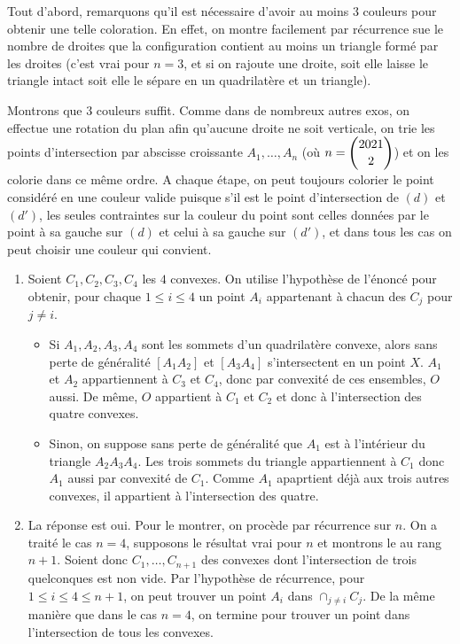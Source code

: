 \begin{sol}
Tout d'abord, remarquons qu'il est nécessaire d'avoir au moins $3$ couleurs pour obtenir une telle coloration. En effet, on montre facilement par récurrence sue le nombre de droites que la configuration contient au moins un triangle formé par les droites (c'est vrai pour $n=3$, et si on rajoute une droite, soit elle laisse le triangle intact soit elle le sépare en un quadrilatère et un triangle).

Montrons que $3$ couleurs suffit. Comme dans de nombreux autres exos, on effectue une rotation du plan afin qu'aucune droite ne soit verticale, on trie les points d'intersection par abscisse croissante $A_1,\ldots,A_n$ (où $n=\dbinom{2021}2$) et on les colorie dans ce même ordre. A chaque étape, on peut toujours colorier le point considéré en une couleur valide puisque s'il est le point d'intersection de $(d)$ et $(d')$, les seules contraintes sur la couleur du point sont celles données par le point à sa gauche sur $(d)$ et celui à sa gauche sur $(d')$, et dans tous les cas on peut choisir une couleur qui convient.
\end{sol}

\begin{sol}
\begin{enumerate}
    \item Soient $C_1,C_2,C_3,C_4$ les $4$ convexes. On utilise l'hypothèse de l'énoncé pour obtenir, pour chaque $1\le i \le 4$ un point $A_i$ appartenant à chacun des $C_j$ pour $j\ne i$. 
    \begin{itemize}
        \item Si $A_1,A_2,A_3,A_4$ sont les sommets d'un quadrilatère convexe, alors sans perte de généralité $[A_1A_2]$ et $[A_3A_4]$ s'intersectent en un point $X$. $A_1$ et $A_2$ appartiennent à $C_3$ et $C_4$, donc par convexité de ces ensembles, $O$ aussi. De même, $O$ appartient à $C_1$ et $C_2$ et donc à l'intersection des quatre convexes.
        \item Sinon, on suppose sans perte de généralité que $A_1$ est à l'intérieur du triangle $A_2A_3A_4$. Les trois sommets du triangle appartiennent à $C_1$ donc $A_1$ aussi par convexité de $C_1$. Comme $A_1$ apaprtient déjà aux trois autres convexes, il appartient à l'intersection des quatre.
    \end{itemize}
    
    \item La réponse est oui. Pour le montrer, on procède par récurrence sur $n$. On a traité le cas $n=4$, supposons le résultat vrai pour $n$ et montrons le au rang $n+1$. Soient donc $C_1,\ldots,C_{n+1}$ des convexes dont l'intersection de trois quelconques est non vide. Par l'hypothèse de récurrence, pour $1\le i\le 4\le n+1$, on peut trouver un point $A_i$ dans $\cap_{j\ne i}C_j$. De la même manière que dans le cas $n=4$, on termine pour trouver un point dans l'intersection de tous les convexes.
\end{enumerate}
\end{sol}

